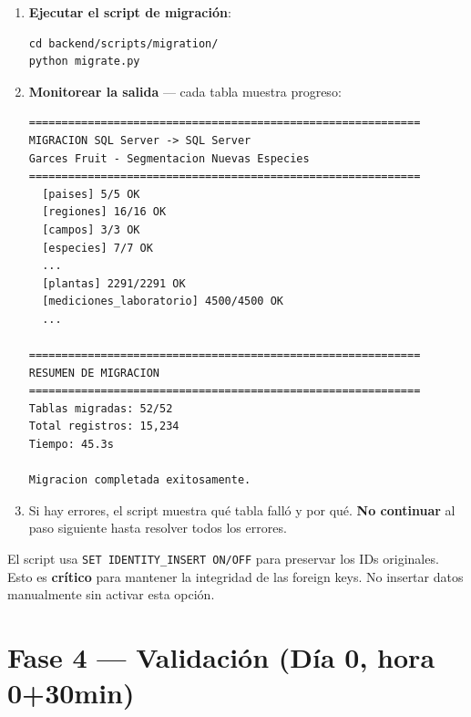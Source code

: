 \documentclass[12pt,a4paper,twoside]{report}
\begin{document}
\begin{enumerate}
    \item \textbf{Ejecutar el script de migraci\'on}:
\begin{lstlisting}[style=bashstyle]
cd backend/scripts/migration/
python migrate.py
\end{lstlisting}
    \item \textbf{Monitorear la salida} --- cada tabla muestra progreso:
\begin{lstlisting}[style=bashstyle]
============================================================
MIGRACION SQL Server -> SQL Server
Garces Fruit - Segmentacion Nuevas Especies
============================================================
  [paises] 5/5 OK
  [regiones] 16/16 OK
  [campos] 3/3 OK
  [especies] 7/7 OK
  ...
  [plantas] 2291/2291 OK
  [mediciones_laboratorio] 4500/4500 OK
  ...

============================================================
RESUMEN DE MIGRACION
============================================================
Tablas migradas: 52/52
Total registros: 15,234
Tiempo: 45.3s

Migracion completada exitosamente.
\end{lstlisting}
    \item Si hay errores, el script muestra qu\'e tabla fall\'o y por qu\'e. \textbf{No continuar} al paso siguiente hasta resolver todos los errores.
\end{enumerate}

\begin{warningbox}
El script usa \texttt{SET IDENTITY\_INSERT ON/OFF} para preservar los IDs originales. Esto es \textbf{cr\'itico} para mantener la integridad de las foreign keys. No insertar datos manualmente sin activar esta opci\'on.
\end{warningbox}

\section{Fase 4 --- Validaci\'on (D\'ia 0, hora 0+30min)}
\end{document}
